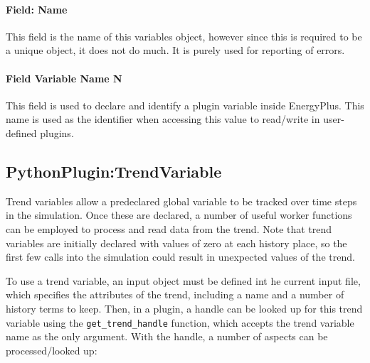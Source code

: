 \paragraph{Field: Name}

This field is the name of this variables object, however since this is required to be a unique object, it does not do much.
It is purely used for reporting of errors.

\paragraph{Field Variable Name N}

This field is used to declare and identify a plugin variable inside EnergyPlus.
This name is used as the identifier when accessing this value to read/write in user-defined plugins.

\subsection{PythonPlugin:TrendVariable}

Trend variables allow a predeclared global variable to be tracked over time steps in the simulation.
Once these are declared, a number of useful worker functions can be employed to process and read data from the trend.
Note that trend variables are initially declared with values of zero at each history place, so the first few calls into the simulation could result in unexpected values of the trend.

To use a trend variable, an input object must be defined int he current input file, which specifies the attributes of the trend, including a name and a number of history terms to keep.
Then, in a plugin, a handle can be looked up for this trend variable using the \verb=get_trend_handle= function, which accepts the trend variable name as the only argument.
With the handle, a number of aspects can be processed/looked up:

